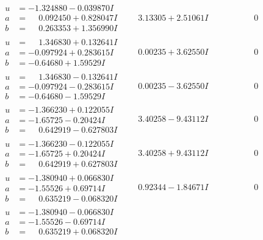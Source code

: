 \documentclass[1p]{elsarticle_modified}
\theoremstyle{definition}
\begin{document}
$$\begin{array}{c|c|c}
\begin{aligned}
u &= -1.324880 - 0.039870 I \\
a &= \phantom{-}0.092450 + 0.828047 I \\
b &= \phantom{-}0.263353 + 1.356990 I\end{aligned}
 & \phantom{-}3.13305 + 2.51061 I & \phantom{-0.000000 } 0 \\ \hline\begin{aligned}
u &= \phantom{-}1.346830 + 0.132641 I \\
a &= -0.097924 + 0.283615 I \\
b &= -0.64680 + 1.59529 I\end{aligned}
 & \phantom{-}0.00235 + 3.62550 I & \phantom{-0.000000 } 0 \\ \hline\begin{aligned}
u &= \phantom{-}1.346830 - 0.132641 I \\
a &= -0.097924 - 0.283615 I \\
b &= -0.64680 - 1.59529 I\end{aligned}
 & \phantom{-}0.00235 - 3.62550 I & \phantom{-0.000000 } 0 \\ \hline\begin{aligned}
u &= -1.366230 + 0.122055 I \\
a &= -1.65725 - 0.20424 I \\
b &= \phantom{-}0.642919 - 0.627803 I\end{aligned}
 & \phantom{-}3.40258 - 9.43112 I & \phantom{-0.000000 } 0 \\ \hline\begin{aligned}
u &= -1.366230 - 0.122055 I \\
a &= -1.65725 + 0.20424 I \\
b &= \phantom{-}0.642919 + 0.627803 I\end{aligned}
 & \phantom{-}3.40258 + 9.43112 I & \phantom{-0.000000 } 0 \\ \hline\begin{aligned}
u &= -1.380940 + 0.066830 I \\
a &= -1.55526 + 0.69714 I \\
b &= \phantom{-}0.635219 - 0.068320 I\end{aligned}
 & \phantom{-}0.92344 - 1.84671 I & \phantom{-0.000000 } 0 \\ \hline\begin{aligned}
u &= -1.380940 - 0.066830 I \\
a &= -1.55526 - 0.69714 I \\
b &= \phantom{-}0.635219 + 0.068320 I\end{aligned}

\end{array}$$
\end{document}
